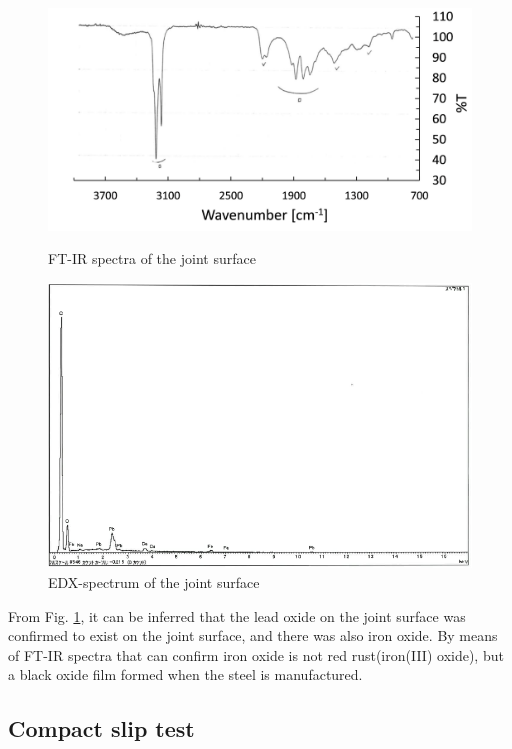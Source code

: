 \begin{figure}
    \centering
    \begin{minipage}[t]{0.7\textwidth}
    \includegraphics[width=\linewidth]{imgs/ch3/fig4.png}
    \caption{FT-IR spectra of the joint surface}
    \label{ch3fig4}  
    \end{minipage}
    \begin{minipage}[t]{0.7\textwidth}
    \includegraphics[width=\linewidth]{imgs/ch3/fig5.png}
    \caption{EDX-spectrum of the joint surface}
    \label{ch3fig5}  
    \end{minipage}
\end{figure}

From Fig. \ref{ch3fig5}, it can be inferred that the lead oxide on the joint surface was confirmed to exist on the joint surface, and there was also iron oxide. By means of FT-IR spectra that can confirm iron oxide is not red rust(iron(III) oxide), but a black oxide film formed when the steel is manufactured.


\subsection{Compact slip test}


